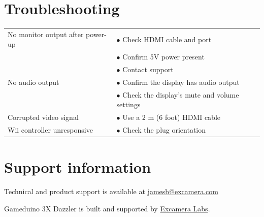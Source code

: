 \documentclass{article}
\newcommand{\device}{Gameduino 3X Dazzler}
\newcommand{\gap}{\vspace{10pt}}
\begin{document}
\newpage
\section{Troubleshooting}

\gap
\begin{tabular}{|l|l|}
\hline
No monitor output after power-up \index{HDMI!no output}\index{no picture}
                                     & $\bullet$ Check HDMI cable and port \\
                                     & $\bullet$ Confirm 5V power present \\
                                     & $\bullet$ Contact support \\
\hline
No audio output                      & $\bullet$ Confirm the display has audio output \\
                                     & $\bullet$ Check the display's mute and volume settings \\
\hline
Corrupted video signal               & $\bullet$ Use a 2 m (6 foot) HDMI cable
\index{HDMI!cable length} \\
\hline
Wii controller unresponsive          & $\bullet$ Check the plug orientation \\
\hline
\end{tabular}
\gap

\section{Support information}

Technical and product support is available at
\href{mailto:jamesb@excamera.com}{jamesb@excamera.com}

\device{} is built and supported by
\href{https://excamera.com}{Excamera Labs}.


\newpage
\raggedright
{}
\renewcommand{\indexname}{Index}
\printindex
\end{document}
